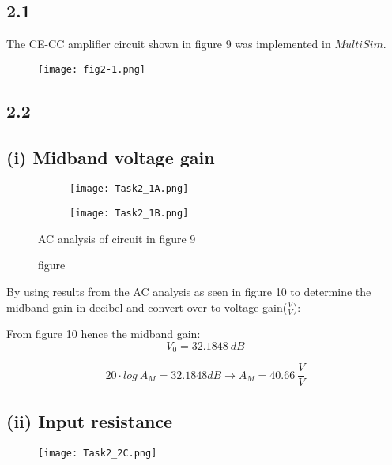 \subsection*{2.1}
  The CE-CC amplifier circuit shown in figure 9 was implemented in $MultiSim$.
    \begin{figure}[h!]
        \centering
        \texttt{[image: fig2-1.png]}
    \end{figure}    


\subsection*{2.2}
  \subsection*{(i) Midband voltage gain}

	\begin{figure}[h]
        \centering
        \begin{subfigure}[h]{0.7\textwidth}
                \texttt{[image: Task2\_1A.png]}
                \label{fig:HJÖRLEIFUR}
        \end{subfigure}
        \begin{subfigure}[h]{0.25\textwidth}
                \texttt{[image: Task2\_1B.png]}
                \label{fig:LÁRUS}
        \end{subfigure}
        \caption{figure}{AC analysis of circuit in figure 9}
	\end{figure}

    By using results from the AC analysis as seen in figure 10 to determine the midband gain in decibel and convert over to voltage gain($\frac{V}{V}$):

   	From figure 10 hence the midband gain:
   	$$ V_{0} = 32.1848 \ dB $$ 

   	$$ 20 \cdot log{\ A_{M}} = 32.1848 dB \rightarrow A_{M} = 40.66\  \frac{V}{V} $$



	\subsection*{(ii) Input resistance}
    \begin{figure}[h!]
        \centering
        \texttt{[image: Task2\_2C.png]}
    \end{figure}  

